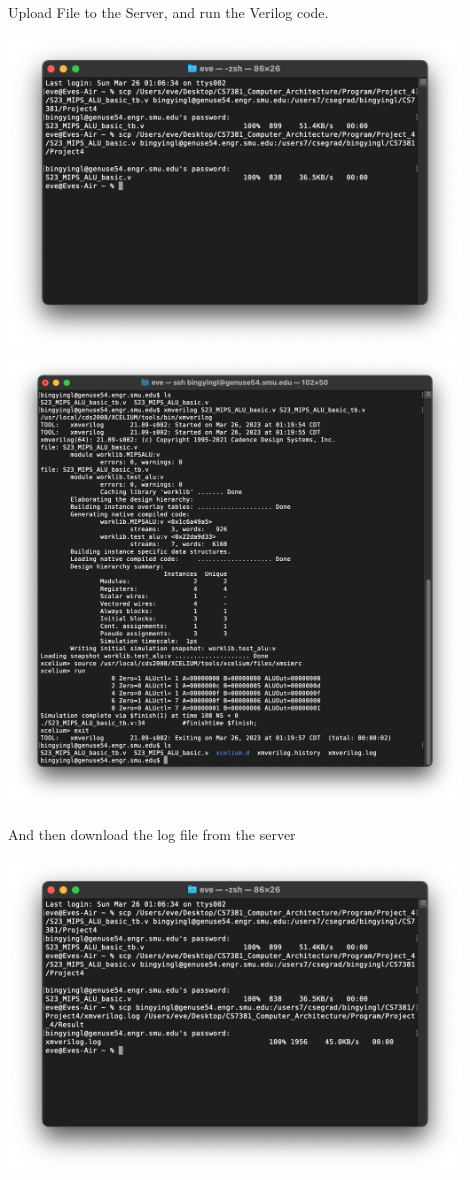 \documentclass[12pt]{article}
\newenvironment{sol}[1][Solution]{\begin{trivlist}\item[\hskip\labelsep {\bfseries #1:}]}{\end{trivlist}}
\begin{document}
    \begin{sol}
    Upload File to the Server, and run the Verilog code. 
    \begin{center}
        \includegraphics[width=0.9\textwidth]{4.png}
        \includegraphics[width=0.9\textwidth]{5.png}
    \end{center}
    And then download the log file from the server
    \begin{center}
        \includegraphics[width=0.9\textwidth]{6.png}

\end{center}
\end{sol}
\end{document}
